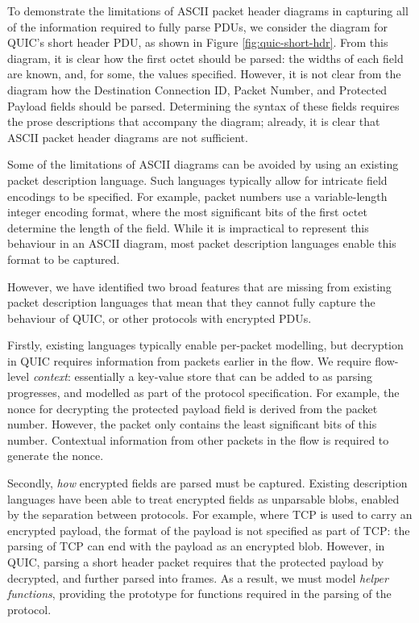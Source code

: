 \documentclass[10pt,sigconf]{acmart}
\begin{document}
To demonstrate the limitations of ASCII packet header diagrams in capturing all of the
information required to fully parse PDUs, we consider the diagram for QUIC's short header
PDU, as shown in Figure \ref{fig:quic-short-hdr}. From this diagram, it is clear how the
first octet should be parsed: the widths of each field are known, and, for some, the
values specified. However, it is not clear from the diagram how the Destination Connection
ID, Packet Number, and Protected Payload fields should be parsed. Determining the syntax
of these fields requires the prose descriptions that accompany the diagram; already, it is
clear that ASCII packet header diagrams are not sufficient.

Some of the limitations of ASCII diagrams can be avoided by using an existing packet
description language. Such languages typically allow for intricate field encodings to be
specified. For example, packet numbers use a variable-length integer encoding format,
where the most significant bits of the first octet determine the length of the field.
While it is impractical to represent this behaviour in an ASCII diagram, most packet
description languages enable this format to be captured.

However, we have identified two broad features that are missing from existing packet
description languages that mean that they cannot fully capture the behaviour of QUIC, or
other protocols with encrypted PDUs.

Firstly, existing languages typically enable per-packet modelling, but decryption in QUIC
requires information from packets earlier in the flow. We require flow-level
\emph{context}: essentially a key-value store that can be added to as parsing progresses,
and modelled as part of the protocol specification. For example, the nonce for decrypting
the protected payload field is derived from the packet number. However, the packet only
contains the least significant bits of this number. Contextual information from other
packets in the flow is required to generate the nonce.

Secondly, \emph{how} encrypted fields are parsed must be captured. Existing description
languages have been able to treat encrypted fields as unparsable blobs, enabled by the
separation between protocols. For example, where TCP is used to carry an encrypted
payload, the format of the payload is not specified as part of TCP: the parsing of TCP can
end with the payload as an encrypted blob. However, in QUIC, parsing a short header packet
requires that the protected payload by decrypted, and further parsed into frames. As a
result, we must model \emph{helper functions}, providing the prototype for functions
required in the parsing of the protocol.
\end{document}
